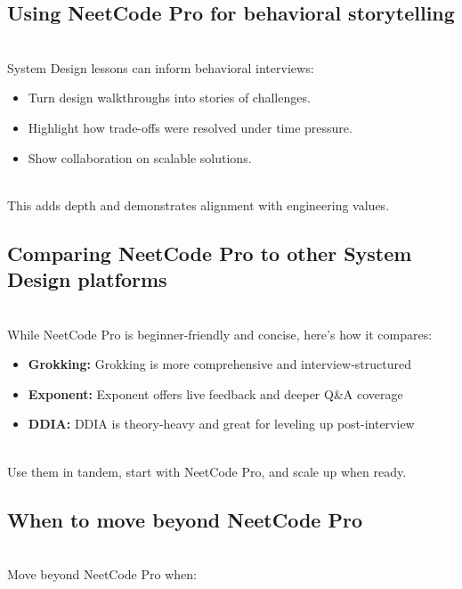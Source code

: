 \subsection{Using NeetCode Pro for behavioral storytelling}\label{bxYkDiWHB6zu3rl6J8tIx}
\\
System Design lessons can inform behavioral interviews:

\begin{itemize}
\item
\protect{}\label{JHAjOjXSeMGiVKolRlJ7q}
Turn design walkthroughs into stories of challenges.
\item
\protect{}\label{OksbqhrRXYYEEpaJToJYe}
Highlight how trade-offs were resolved under time pressure.
\item
\protect{}\label{N4E8FfuvttVP2Jid8prpQ}
Show collaboration on scalable solutions.
\end{itemize}
\\
This adds depth and demonstrates alignment with engineering values.

\subsection{Comparing NeetCode Pro to other System Design platforms}\label{YXyb0N4Cfan9NZGwRAvz4}
\\
While NeetCode Pro is beginner-friendly and concise, here's how it compares:

\begin{itemize}
\item
\protect{}\label{6wTL7wvn0AJxzhC3R6ah0}
\textbf{Grokking:} Grokking is more comprehensive and interview-structured
\item
\protect{}\label{5tElwFKrKT2SJ3S-iMvXN}
\textbf{Exponent:} Exponent offers live feedback and deeper Q\&A coverage
\item
\protect{}\label{g02WoNDN9ftYM3v-kxHUI}
\textbf{DDIA:} DDIA is theory-heavy and great for leveling up post-interview
\end{itemize}
\\
Use them in tandem, start with NeetCode Pro, and scale up when ready.

\subsection{When to move beyond NeetCode Pro}\label{Zoqo_ahbLq5sLAXb2ZCVI}
\\
Move beyond NeetCode Pro when:

